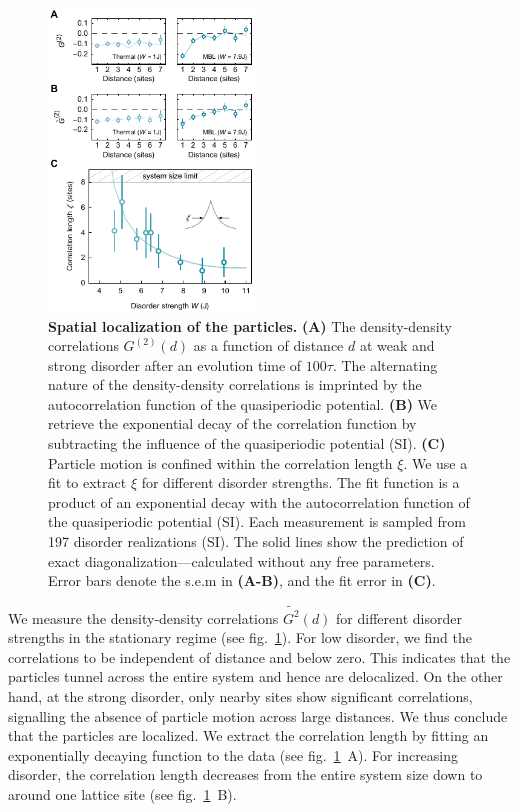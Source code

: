 \begin{figure}[h!]
	\centering
	\includegraphics[width=55mm]{figures/MBL_localization.pdf}
	\caption{{\bf Spatial localization of the particles.} {\bf{(A)}} The density-density correlations $G^{(2)} (d)$ as a function of distance $d$ at weak and strong disorder after an evolution time of $100\tau$. The alternating nature of the density-density correlations is imprinted by the autocorrelation function of the quasiperiodic potential. {\bf (B)} We retrieve the exponential decay of the correlation function by subtracting the influence of the quasiperiodic potential (SI). {\bf (C)} Particle motion is confined within the correlation length $\xi$. We use a fit to extract $\xi$ for different disorder strengths. The fit function is a product of an exponential decay with the autocorrelation function of the quasiperiodic potential (SI). Each measurement is sampled from 197 disorder realizations (SI). The solid lines show the prediction of exact diagonalization---calculated without any free parameters. Error bars denote the s.e.m in {\bf (A-B)}, and the fit error in {\bf (C)}.}
	\label{fig:MBL_localization}
\end{figure}

We measure the density-density correlations $\widetilde{G^{2}}(d)$ for different disorder strengths in the stationary regime (see fig.~\ref{fig:MBL_localization}). For low disorder, we find the correlations to be independent of distance and below zero. This indicates that the particles tunnel across the entire system and hence are delocalized. On the other hand, at the strong disorder, only nearby sites show significant correlations, signalling the absence of particle motion across large distances. We thus conclude that the particles are localized. We extract the correlation length by fitting an exponentially decaying function to the data (see fig.~\ref{fig:MBL_localization}~A). For increasing disorder, the correlation length decreases from the entire system size down to around one lattice site (see fig.~\ref{fig:MBL_localization}~B). 

